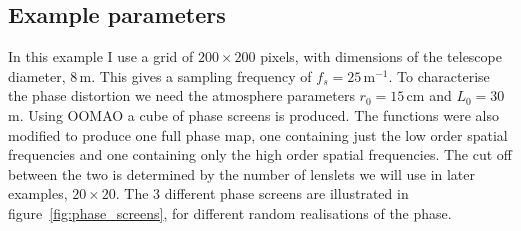 \documentclass[pdf]{note}
\begin{document}
\subsection{Example parameters}

In this example I use a grid of $200\times 200$ pixels, with dimensions of the telescope
diameter, 8\,m.  This gives a sampling frequency of $f_s = 25$\,m$^{-1}$.
To characterise the phase distortion we need the atmosphere parameters $r_0 = 15$\,cm
and $L_0 = 30$\,m.  Using OOMAO a cube of phase screens is produced.  The functions
were also modified to produce one full phase map, one containing just the low
order spatial frequencies and one containing only the high order spatial frequencies.
The cut off between the two is determined by the number of lenslets we will use
in later examples, $20\times20$.  The 3 different phase screens are illustrated
in figure~\ref{fig:phase_screens}, for different random realisations of the phase.
\end{document}
